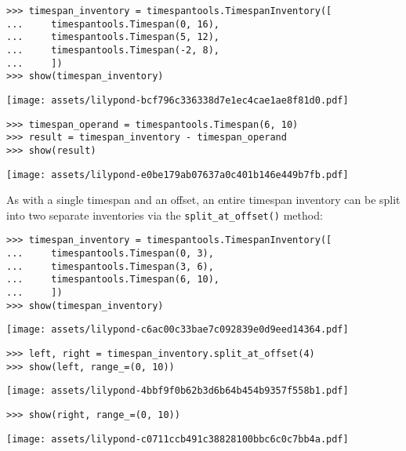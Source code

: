 \begin{abjadbookoutput}
\begin{singlespacing}
\vspace{-0.5\baselineskip}
\begin{verbatim}
>>> timespan_inventory = timespantools.TimespanInventory([
...     timespantools.Timespan(0, 16),
...     timespantools.Timespan(5, 12),
...     timespantools.Timespan(-2, 8),
...     ])
>>> show(timespan_inventory)
\end{verbatim}
\noindent\texttt{[image: assets/lilypond-bcf796c336338d7e1ec4cae1ae8f81d0.pdf]}
\begin{verbatim}
>>> timespan_operand = timespantools.Timespan(6, 10)
>>> result = timespan_inventory - timespan_operand
>>> show(result)
\end{verbatim}
\noindent\texttt{[image: assets/lilypond-e0be179ab07637a0c401b146e449b7fb.pdf]}
\end{singlespacing}
\end{abjadbookoutput}

\noindent As with a single timespan and an offset, an entire timespan inventory
can be split into two separate inventories via the \texttt{split\_at\_offset()}
method:

\begin{comment}
<abjad>
timespan_inventory = timespantools.TimespanInventory([
    timespantools.Timespan(0, 3),
    timespantools.Timespan(3, 6),
    timespantools.Timespan(6, 10),
    ])
show(timespan_inventory)
left, right = timespan_inventory.split_at_offset(4)
show(left, range_=(0, 10))
show(right, range_=(0, 10))
</abjad>
\end{comment}

\begin{abjadbookoutput}
\begin{singlespacing}
\vspace{-0.5\baselineskip}
\begin{verbatim}
>>> timespan_inventory = timespantools.TimespanInventory([
...     timespantools.Timespan(0, 3),
...     timespantools.Timespan(3, 6),
...     timespantools.Timespan(6, 10),
...     ])
>>> show(timespan_inventory)
\end{verbatim}
\noindent\texttt{[image: assets/lilypond-c6ac00c33bae7c092839e0d9eed14364.pdf]}
\begin{verbatim}
>>> left, right = timespan_inventory.split_at_offset(4)
>>> show(left, range_=(0, 10))
\end{verbatim}
\noindent\texttt{[image: assets/lilypond-4bbf9f0b62b3d6b64b454b9357f558b1.pdf]}
\begin{verbatim}
>>> show(right, range_=(0, 10))
\end{verbatim}
\noindent\texttt{[image: assets/lilypond-c0711ccb491c38828100bbc6c0c7bb4a.pdf]}
\end{singlespacing}
\end{abjadbookoutput}

